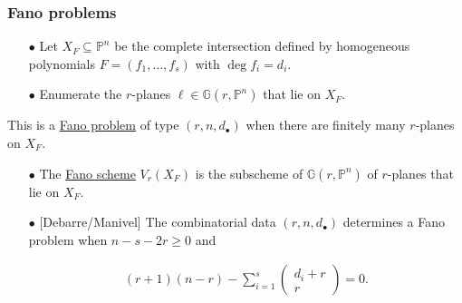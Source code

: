 \documentclass{beamer}
\theoremstyle{definition}
\newcommand{\blue}[1]{{\color{black!15!blue}\underline{#1}}}
\begin{document}
\begin{frame}
\frametitle{Fano problems}
\begin{enumerate}
\item[$\bullet$] Let $X_F\subseteq\mathbb{P}^n$ be the complete intersection defined by homogeneous polynomials $F=(f_1,\dotsc,f_s)$ with $\deg f_i = d_i$.

\item[$\bullet$] Enumerate the $r$-planes $\ell\in\mathbb{G}(r,\mathbb{P}^n)$ that lie on $X_F$. 
\end{enumerate}

This is a \blue{Fano problem} of type $(r,n,d_\bullet)$ when there are finitely many $r$-planes on $X_F$.

\begin{enumerate}
\pause

\item[$\bullet$] The \blue{Fano scheme} $V_r(X_F)$ is the subscheme of $\mathbb{G}(r,\mathbb{P}^n)$ of $r$-planes that lie on $X_F$.

\pause

\item[$\bullet$] [Debarre/Manivel] The combinatorial data $(r,n,d_\bullet)$ determines a Fano problem when $n-s-2r\ge 0$ and

\vspace{-.3cm}
\hspace{-1.2cm}
\begin{minipage}{.99\textwidth}
\begin{align*}
(r+1)(n-r) - \sum_{i=1}^s \begin{pmatrix}d_i + r\\r\end{pmatrix}=0.
\end{align*}
\end{minipage}
\end{enumerate}

\end{frame}
\end{document}
